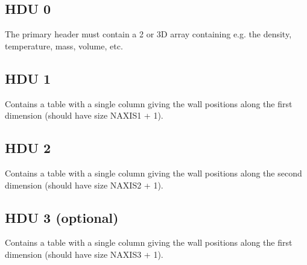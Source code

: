 \documentclass[11pt]{article}
\begin{document}
\subsection{HDU 0}

The primary header must contain a 2 or 3D array containing e.g. the density, temperature, mass, volume, etc.

\subsection{HDU 1}

Contains a table with a single column giving the wall positions along the first dimension (should have size NAXIS1 + 1).

\subsection{HDU 2}

Contains a table with a single column giving the wall positions along the second dimension (should have size NAXIS2 + 1).

\subsection{HDU 3 (optional)}

Contains a table with a single column giving the wall positions along the first dimension (should have size NAXIS3 + 1).
\end{document}
